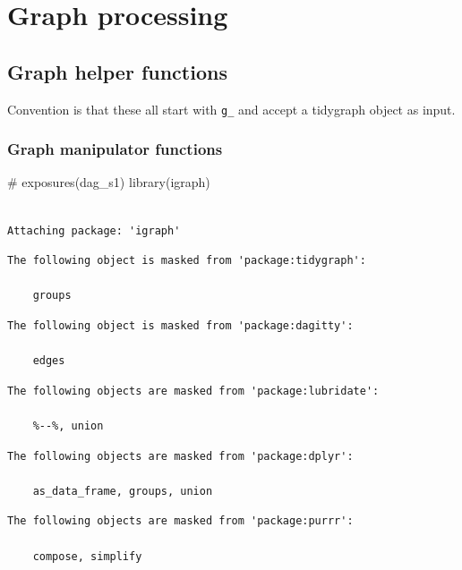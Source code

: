 \documentclass[
  letterpaper,
  DIV=11,
  numbers=noendperiod]{scrartcl}
\newenvironment{Shaded}{\begin{snugshade}}{\end{snugshade}}
\newcommand{\CommentTok}[1]{\textcolor[rgb]{0.37,0.37,0.37}{#1}}
\newcommand{\FunctionTok}[1]{\textcolor[rgb]{0.28,0.35,0.67}{#1}}
\newcommand{\NormalTok}[1]{\textcolor[rgb]{0.00,0.23,0.31}{#1}}
\begin{document}
\section{Graph processing}\label{graph-processing}

\subsection{Graph helper functions}\label{graph-helper-functions}

Convention is that these all start with \texttt{g\_} and accept a
tidygraph object as input.

\subsubsection{Graph manipulator
functions}\label{graph-manipulator-functions}

\begin{Shaded}
\begin{Highlighting}[]
\CommentTok{\# exposures(dag\_s1)}
\FunctionTok{library}\NormalTok{(igraph)}
\end{Highlighting}
\end{Shaded}

\begin{verbatim}

Attaching package: 'igraph'
\end{verbatim}

\begin{verbatim}
The following object is masked from 'package:tidygraph':

    groups
\end{verbatim}

\begin{verbatim}
The following object is masked from 'package:dagitty':

    edges
\end{verbatim}

\begin{verbatim}
The following objects are masked from 'package:lubridate':

    %--%, union
\end{verbatim}

\begin{verbatim}
The following objects are masked from 'package:dplyr':

    as_data_frame, groups, union
\end{verbatim}

\begin{verbatim}
The following objects are masked from 'package:purrr':

    compose, simplify
\end{verbatim}
\end{document}

